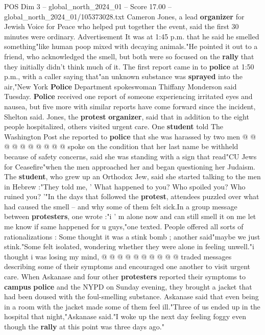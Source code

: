 \begin{textsample}{POS Dim 3 – global\_north\_2024\_01 – Score 17.00 – global\_north\_2024\_01/105373028.txt}
Cameron Jones, a lead \textbf{organizer} for Jewish Voice for Peace who helped put together the event, said the first 30 minutes were ordinary.
Advertisement It was at 1:45 p.m. that he said he smelled something"like human poop mixed with decaying animals."He pointed it out to a friend, who acknowledged the smell, but both were so focused on the \textbf{rally} that they initially didn't think much of it.
The first report came in to \textbf{police} at 1:50 p.m., with a caller saying that"an unknown substance was \textbf{sprayed} into the air,"New York \textbf{Police} Department spokeswoman Thiffany Monderson said Tuesday. \textbf{Police} received one report of someone experiencing irritated eyes and nausea, but five more with similar reports have come forward since the incident, Shelton said.
Jones, the \textbf{protest} \textbf{organizer}, said that in addition to the eight people hospitalized, others visited urgent care.
One \textbf{student} told The Washington Post she reported to \textbf{police} that she was harassed by two men @ @ @ @ @ @ @ @ @ @ spoke on the condition that her last name be withheld because of safety concerns, said she was standing with a sign that read"CU Jews for Ceasefire"when the men approached her and began questioning her Judaism.
The \textbf{student}, who grew up an Orthodox Jew, said she started talking to the men in Hebrew :"They told me, ' What happened to you?
Who spoiled you?
Who ruined you? '"In the days that followed the \textbf{protest}, attendees puzzled over what had caused the smell -- and why some of them felt sick.In a group message between \textbf{protesters}, one wrote :"i ' m alone now and can still smell it on me let me know if same happened for u guys,"one texted.
People offered all sorts of rationalizations : Some thought it was a stink bomb ; another said"maybe we just stink."Some felt isolated, wondering whether they were alone in feeling unwell."i thought i was losing my mind, @ @ @ @ @ @ @ @ @ @ traded messages describing some of their symptoms and encouraged one another to visit urgent care.
When Askanase and four other \textbf{protesters} reported their symptoms to \textbf{campus} \textbf{police} and the NYPD on Sunday evening, they brought a jacket that had been doused with the foul-smelling substance.
Askanase said that even being in a room with the jacket made some of them feel ill."Three of us ended up in the hospital that night,"Askanase said."I woke up the next day feeling foggy even though the \textbf{rally} at this point was three days ago."

\end{textsample}
